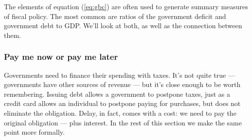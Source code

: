 \documentclass[letterpaper,12pt]{article}
\begin{document}
The elements of equation (\ref{eq:gbc}) 
are often used to generate summary measures 
of fiscal policy. 
The most common are ratios  of 
the government deficit and government debt to GDP.  
We'll look at both, as well as the connection between them.  


\subsubsection*{Pay me now or pay me later}  


Governments need to finance their spending with taxes.
It's not quite true --- governments have other sources of revenue ---
but it's close enough to be worth remembering.  
Issuing debt allows a government to postpone taxes, 
just as a credit card allows an individual to postpone paying 
for purchases, 
but does not eliminate the obligation.  
Delay, in fact, comes with a cost:  we need to pay the original 
obligation --- plus interest.  
In the rest of this section we make the same point more formally.  
\end{document}
